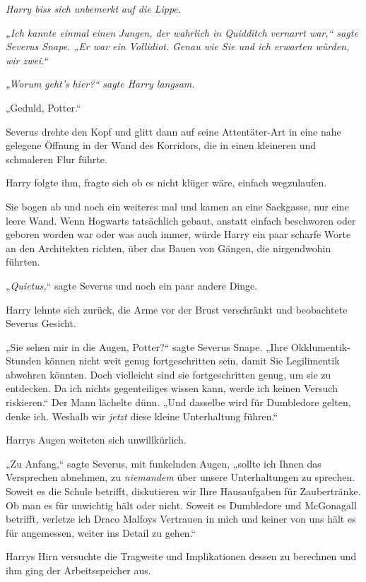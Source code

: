 {\emph{Harry biss sich} \emph{unbemerkt} \emph{auf die Lippe.}

\emph{„Ich kannte einmal einen} \emph{Jungen, der wahrlich in Quidditch vernarrt war,“ sagte Severus Snape. „Er war ein Vollidiot.} \emph{Genau wie Sie und ich erwarten würden, wir zwei.“}

\emph{„Worum} \emph{\emph{geht's}} \emph{hier?“ sagte Harry langsam.}

„Geduld, Potter.“

Severus drehte den Kopf und glitt dann auf seine Attentäter-Art in eine nahe gelegene Öffnung in der Wand des Korridors, die in einen kleineren und schmaleren Flur führte.

Harry folgte ihm, fragte sich ob es nicht klüger wäre, einfach wegzulaufen.

Sie bogen ab und noch ein weiteres mal und kamen an eine Sackgasse, nur eine leere Wand. Wenn Hogwarts tatsächlich gebaut, anstatt einfach beschworen oder geboren worden war oder was auch immer, würde Harry ein paar scharfe Worte an den Architekten richten, über das Bauen von Gängen, die nirgendwohin führten.

„\emph{Quietus,}“ sagte Severus und noch ein paar andere Dinge.

Harry lehnte sich zurück, die Arme vor der Brust verschränkt und beobachtete Severus Gesicht.

„Sie sehen mir in die Augen, Potter?“ sagte Severus Snape. „Ihre Okklumentik-Stunden können nicht weit genug fortgeschritten sein, damit Sie Legilimentik abwehren könnten. Doch vielleicht sind sie fortgeschritten genug, um sie zu entdecken. Da ich nichts gegenteiliges wissen kann, werde ich keinen Versuch riskieren.“ Der Mann lächelte dünn. „Und dasselbe wird für Dumbledore gelten, denke ich. Weshalb wir \emph{jetzt} diese kleine Unterhaltung führen.“

Harrys Augen weiteten sich unwillkürlich.

„Zu Anfang,“ sagte Severus, mit funkelnden Augen, „sollte ich Ihnen das Versprechen abnehmen, zu \emph{niemandem} über unsere Unterhaltungen zu sprechen. Soweit es die Schule betrifft, diskutieren wir Ihre Hausaufgaben für Zaubertränke. Ob man es für unwichtig hält oder nicht. Soweit es Dumbledore und McGonagall betrifft, verletze ich Draco Malfoys Vertrauen in mich und keiner von uns hält es für angemessen, weiter ins Detail zu gehen.“

Harrys Hirn versuchte die Tragweite und Implikationen dessen zu berechnen und ihm ging der Arbeitsspeicher aus.

}
